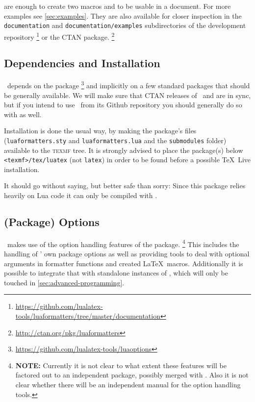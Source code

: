 \documentclass[12pt]{scrartcl}
\begin{document}
\noindent are enough to create two macros 
and  to be usable in
a document.  For more examples see \vref{sec:examples}.  They are also available
for closer inspection in the \texttt{documentation} and
\texttt{documentation/examples} subdirectories of the development repository%
\footnote{\url{https://github.com/lualatex-tools/luaformatters/tree/master/documentation}} %
or the CTAN package.%
\footnote{\url{http://ctan.org/pkg/luaformatters}}

\subsection{Dependencies and Installation}
\label{sec:intro:dependencies-and-installation}

\luaformatters\ depends on the  package%
\footnote{\url{https://github.com/lualatex-tools/luaoptions}} %
and implicitly on a few standard packages that should be generally available.
We will make sure that CTAN releases of \luaformatters\ and 
are in sync, but if you intend to use \luaformatters\ from its Github repository
you should generally do so with  as well.

Installation is done the usual way, by making the package's files
(\texttt{luaformatters.sty} and \texttt{luaformatters.lua} and the
\texttt{submodules} folder) available to the \textsc{texmf} tree.  It is
strongly advised to place the package(s) below \texttt{<texmf>/tex/luatex} (not
\texttt{latex}) in order to be found before a possible \TeX\ Live installation.

 It should go without saying, but better safe than sorry: Since
this package relies heavily on Lua code it can only be compiled with
.


\subsection{(Package) Options}
\label{sec:intro:options}

\luaformatters\ makes use of the option handling features of the
 package.%
\footnote{\textbf{NOTE:} Currently it is not clear to what extent these features will
	be factored out to an independent package, possibly merged with \luaformatters.
	Also it is not clear whether there will be an independent manual for the option handling
	tools.} %
This includes the handling of \luaformatters' own package options as
well as providing tools to deal with optional arguments in formatter functions
and created \LaTeX\ macros.  Additionally it is possible to integrate that with
standalone instances of , which will only be touched in
\vref{sec:advanced-programming}.
\end{document}
